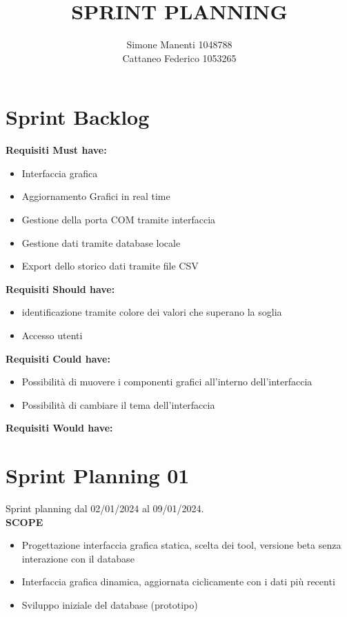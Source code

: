 \documentclass{report}
\title{SPRINT PLANNING}
\author{Simone Manenti 1048788 \\ Cattaneo Federico 1053265}
\begin{document}
\maketitle
\chapter{Sprint Backlog}
\textbf{Requisiti Must have:}
\begin{itemize}
\item Interfaccia grafica
\item Aggiornamento Grafici in real time
\item Gestione della porta COM tramite interfaccia
\item Gestione dati tramite database locale
\item Export dello storico dati tramite file CSV
\end{itemize}

\textbf{Requisiti Should have:}
\begin{itemize}
\item identificazione tramite colore dei valori che superano la soglia
\item Accesso utenti
\end{itemize}

\textbf{Requisiti Could have:}
\begin{itemize}
\item Possibilità di muovere i componenti grafici all'interno dell'interfaccia
\item Possibilità di cambiare il tema dell'interfaccia
\end{itemize}

\textbf{Requisiti Would have:}

\chapter{Sprint Planning 01}
Sprint planning dal 02/01/2024 al 09/01/2024.\\

\textbf{SCOPE}
\begin{itemize}
\item Progettazione interfaccia grafica statica, scelta dei tool, versione beta senza interazione con il database
\item Interfaccia grafica dinamica, aggiornata ciclicamente con i dati più recenti
\item Sviluppo iniziale del database (prototipo)
\end{itemize}
\end{document}
